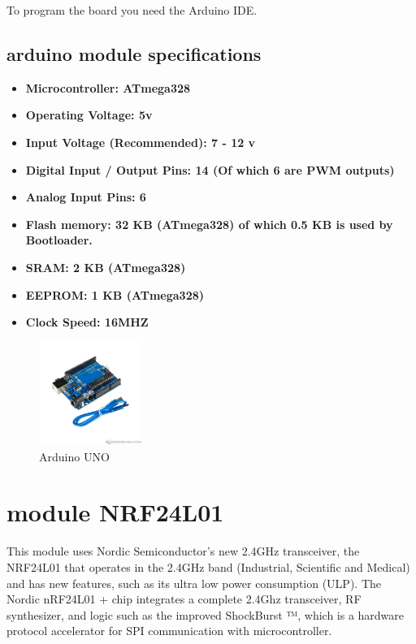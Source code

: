 \documentclass[journal,trans]{IEEEtran}
\begin{document}
To program the board you need the Arduino IDE.

\subsection{\textbf{arduino module specifications }}
\begin{itemize}
  \item \textbf{ Microcontroller: ATmega328}
    \item \textbf{ Operating Voltage: 5v }
    \item \textbf{ Input Voltage (Recommended): 7 - 12 v }
    \item \textbf{ Digital Input / Output Pins: 14 (Of which 6 are PWM outputs)}
	\item \textbf{ Analog Input Pins: 6} 
	\item \textbf{ Flash memory: 32 KB (ATmega328) of which 0.5 KB is used by Bootloader.} 
    \item \textbf{ SRAM: 2 KB (ATmega328)} 
    \item \textbf{ EEPROM: 1 KB (ATmega328)} 
    \item \textbf{ Clock Speed: 16MHZ} 

\end{itemize}
\begin{figure}[h]
    \includegraphics[width=0.3\textwidth]{ArduinoUno.jpg}
    \centering
    \caption{Arduino UNO}
    \label{fig:my_label}
\end{figure}

\section{\textbf{module NRF24L01}}
This module uses Nordic Semiconductor's new 2.4GHz transceiver, the NRF24L01 that operates in the 2.4GHz band (Industrial, Scientific and Medical) and has new features, such as its ultra low power consumption (ULP). The Nordic nRF24L01 + chip integrates a complete 2.4Ghz transceiver, RF synthesizer, and logic such as the improved ShockBurst ™, which is a hardware protocol accelerator for SPI communication with microcontroller.
\end{document}
